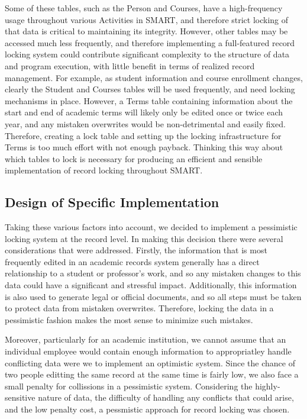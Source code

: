 \documentclass[12pt]{article}
\begin{document}
Some of these tables, such as the Person and Courses, have a high-frequency usage throughout various Activities in SMART, and therefore strict locking of that data is critical to maintaining its integrity. However, other tables may be accessed much less frequently, and therefore implementing a full-featured record locking system could contribute significant complexity to the structure of data and program execution, with little benefit in terms of realized record management. For example, as student information and course enrollment changes, clearly the Student and Courses tables will be used frequently, and need locking mechanisms in place. However, a Terms table containing information about the start and end of academic terms will likely only be edited once or twice each year, and any mistaken overwrites would be non-detrimental and easily fixed. Therefore, creating a lock table and setting up the locking infrastructure for Terms is too much effort with not enough payback. Thinking this way about which tables to lock is necessary for producing an efficient and sensible implementation of record locking throughout SMART.

\subsection{Design of Specific Implementation}

Taking these various factors into account, we decided to implement a pessimistic locking system at the record level. In making this decision there were several considerations that were addressed. Firstly, the information that is most frequently edited in an academic records system generally has a direct relationship to a student or professor's work, and so any mistaken changes to this data could have a significant and stressful impact. Additionally, this information is also used to generate legal or official documents, and so all steps must be taken to protect data from mistaken overwrites. Therefore, locking the data in a pessimistic fashion makes the most sense to minimize such mistakes. 

Moreover, particularly for an academic institution, we cannot assume that an individual employee would contain enough information to appropriatley handle conflicting data were we to implement an optimistic system. Since the chance of two people editting the same record at the same time is fairly low, we also face a small penalty for collissions in a pessimistic system. Considering the highly-sensitive nature of data, the difficulty of handling any conflicts that could arise, and the low penalty cost, a pessmistic approach for record locking was chosen.
\end{document}
